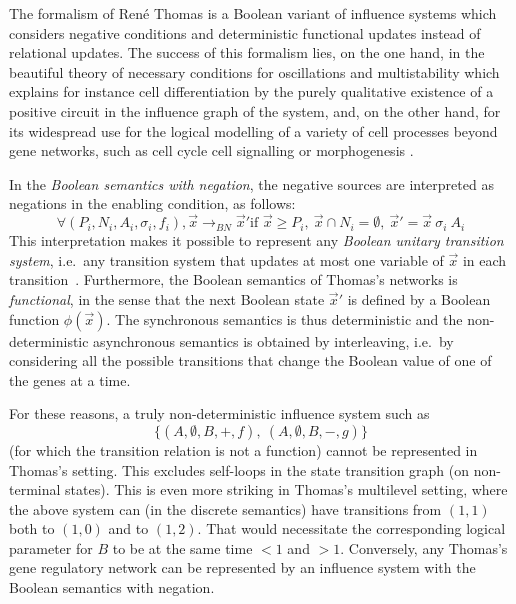 \documentclass[graybox]{svmult}
\newcommand{\lra}{\longrightarrow}
\begin{document}
The formalism of Ren\'e Thomas \cite{TA90book} 
is a Boolean variant of influence systems
which considers negative conditions and deterministic functional updates instead of relational updates.
The success of this formalism lies, on the one hand,
  in the beautiful theory
  of necessary conditions for oscillations and multistability \cite{RRT08aam,Ruet16mfcs} which explains for instance cell differentiation
  by the purely qualitative existence of a positive circuit in the influence graph of the system, and, on the other hand, 
  for its widespread use for the logical modelling of a variety of cell processes beyond gene networks, such as 
  cell cycle \cite{FNLCCT09mb} cell signalling \cite{GCBRKT13plos} or morphogenesis \cite{GCT08bi,SCT08ijdb}.

In the \emph{Boolean semantics with negation},
the negative sources are interpreted as negations in the enabling condition, as follows:
$$\forall (P_i, N_i, A_i, \sigma_i, f_i), {\vec       x}\lra_{BN}{\vec x'}\text{if }{\vec x}\geq P_i,\ {\vec x}\cap N_i=\emptyset,\ {\vec x'} =       {\vec x}\ \sigma_i\ A_i$$
This interpretation makes it possible to represent any \emph{Boolean unitary transition system}, i.e.~any transition system that updates at most one variable of $\vec x$ in each transition~\cite{FMRS16cmsb}.
Furthermore, the Boolean semantics of Thomas's networks is \emph{functional}, in the sense that
the next Boolean state ${\vec x}'$ is defined by a Boolean function $\phi(\vec x)$.
The synchronous semantics is thus deterministic and the non-deterministic asynchronous semantics
is obtained by interleaving, i.e.~by considering all the possible transitions that change the Boolean value of one of the genes at a time.

For these reasons,
a truly non-deterministic influence system such as
$$\{(A,\emptyset,B,+,f),\ (A,\emptyset, B,-,g)\}$$
(for which the transition relation is not a function)
cannot be represented in Thomas's setting.
This excludes self-loops in the state transition graph (on non-terminal states).
This is even more striking in Thomas's multilevel setting, where the above
system can (in the discrete semantics) have transitions from $(1,1)$ both to
$(1,0)$ and to $(1,2)$. That would necessitate the corresponding logical
parameter for $B$ to be at the same time $<1$ and $>1$.
Conversely, any Thomas's gene regulatory network can be represented by an influence system with the Boolean semantics with negation.
\end{document}

